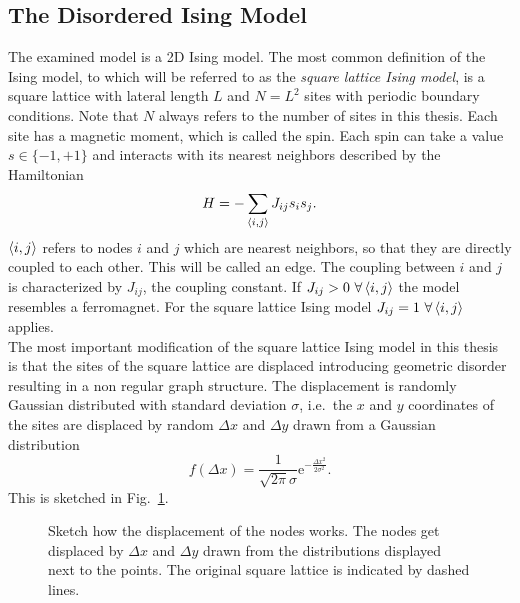 \subsection{The Disordered Ising Model}
\label{ssec:isingmodel}
    The examined model is a 2D Ising model.
    The most common definition of the Ising model, to which will be referred to
    as the \emph{square lattice Ising model}, is a square lattice with
    lateral length \(L\) and \(N=L^2\) sites with periodic boundary conditions.
    Note that \(N\) always refers to the number of sites in this thesis.
    Each site has a magnetic moment, which is called the spin. Each
    spin can take a value \(s \in \{-1,+1\}\) and interacts with its
    nearest neighbors described by the Hamiltonian
    \begin{equation}
        H = - \sum_{\left< i,j \right>}J_{ij}s_{i}s_{j}.
        \label{eq:hamiltonian}
    \end{equation}
    \(\left< i,j \right>\) refers to nodes \(i\) and \(j\) which are nearest
    neighbors, so that they are directly coupled to each other. This will
    be called an edge. The
    coupling between \(i\) and \(j\) is characterized by \(J_{ij}\),
    the coupling constant. If \(J_{ij} > 0 \ \forall \avg{i,j}\) the model resembles a ferromagnet.
    For the square lattice Ising model \(J_{ij} = 1 \ \forall \avg{i,j}\) applies.\\
    The most important modification of the square lattice Ising model in this
    thesis is that the sites of the square lattice are displaced introducing
    geometric disorder resulting in a non regular graph structure.
    The displacement is randomly Gaussian distributed with standard
    deviation \(\sigma\), i.e.\ the \(x\) and \(y\) coordinates of the
    sites are displaced by random \(\Delta x\) and \(\Delta y\) drawn
    from a Gaussian distribution
    \begin{equation}
        f(\Delta x)=\frac{1}{\sqrt{2\pi}\sigma}\mathrm{e}^{-\frac{\Delta x^2}{2\sigma^2}}.
        \label{eq:gauss}
    \end{equation}
    This is sketched in Fig.\ \ref{fig:displacement}.
    \begin{figure}[htbp]
        \centering
        
        \caption[Sketch how the Displacement works]
        {
            Sketch how the displacement of the nodes works. The nodes
            get displaced by \(\Delta x\) and \(\Delta y\) drawn from the
            distributions displayed next to the points. The original
            square lattice is indicated by dashed lines.
        }
        \label{fig:displacement}
    \end{figure}\\
